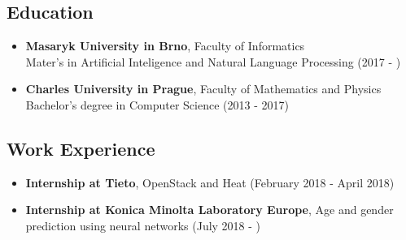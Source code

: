 \documentclass[a4,12pt]{article}
\begin{document}
\subsection*{Education}\label{education}

\begin{itemize}
\item
  \textbf{Masaryk University in Brno}, Faculty of Informatics\\
  Mater's in Artificial Inteligence and Natural Language Processing (2017 - )
\item
  \textbf{Charles University in Prague}, Faculty of Mathematics and
  Physics\\
  Bachelor's degree in Computer Science (2013 - 2017)
\end{itemize}

\subsection*{Work Experience}\label{work}

\begin{itemize}
\item
  \textbf{Internship at Tieto}, OpenStack and Heat (February 2018 - April 2018)
\item
  \textbf{Internship at Konica Minolta Laboratory Europe}, Age and gender prediction using neural networks (July 2018 - )
\end{itemize}
\end{document}
